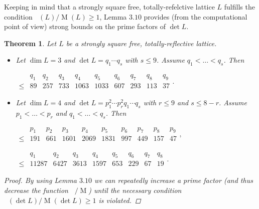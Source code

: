 \documentclass{amsart}
\newtheorem{thm}{Theorem}[section]
\theoremstyle{definition}
\theoremstyle{remark}
\DeclareMathOperator{\M}{M}
\DeclareMathOperator{\Nref}{N_{ref}}
\begin{document}
Keeping in mind that a strongly square free, totally-refelctive lattice $L$ fulfills the condition $\Nref(L) / \M(L) \geq 1$, 
Lemma $3.10$ provides (from the computational point of view) strong bounds on the prime factors of $\det L$. 
\begin{thm}
 Let $L$ be a strongly square free, totally-reflective lattice.
\begin{itemize}
 \item[(a)] Let $\dim L=3$ and $\det L =q_1 \cdots q_s$ with $s \leq 9$. Assume $q_1 < \dots < q_s$. Then
 \medskip
 \begin{center}
  $
 \begin{array}{c|c|c|c|c|c|c|c|c|c|}
  & q_1 & q_2 & q_3 & q_4 & q_5 & q_6 & q_7 & q_8 & q_9\\
  \hline
  \leq & 89 & 257 & 733 & 1063 & 1033 & 607 & 293 & 113 & 37
 \end{array}.
  $
 \end{center}
 \medskip
 \item[(b)] Let $\dim L=4$ and $\det L =p_1^2 \cdots p_r^2 q_1 \cdots q_s$ with $r \leq 9$ and $s \leq 8-r$. Assume $p_1 < \dots < p_r$ and $q_1 < \dots < q_s$. Then
 \medskip
 \begin{center}
  $
 \begin{array}{c|c|c|c|c|c|c|c|c|c|}
  & p_1 & p_2 & p_3 & p_4 & p_5 & p_6 & p_7 & p_8 & p_9 \\
  \hline
  \leq & 191 & 661 & 1601 & 2069 & 1831 & 997 & 449 & 157 & 47
 \end{array},
  $
 \end{center}
 \medskip
 \begin{center}
  $
 \begin{array}{c|c|c|c|c|c|c|c|c|}
  & q_1 & q_2 & q_3 & q_4 & q_5 & q_6 & q_7 & q_8\\
  \hline
  \leq & 11287 & 6427 & 3613 & 1597 & 653 & 229 & 67 & 19
 \end{array}.
  $
 \end{center}
\end{itemize}
 \begin{proof}
  By using Lemma $3.10$ we can repeatedly increase a prime factor (and thus decrease the function $\Nref/\M$) 
  until the necessary condition $\Nref(\det L) / \M(\det L) \geq 1$ is violated.
 \end{proof}
\end{thm}
\end{document}
